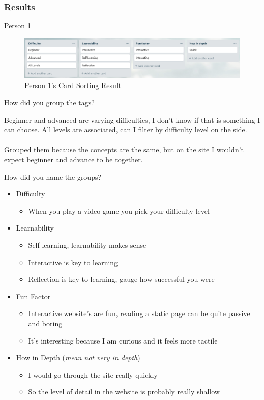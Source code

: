 \subsubsection{Results}
\begin{note}{Person 1}
	\begin{figure}[H]
		\centering
		\includegraphics[width=\linewidth]{card1}	
		\caption{Person 1's Card Sorting Result}
	\end{figure}

	How did you group the tags?
	\begin{leftbar}
		Beginner and advanced are varying difficulties, I don't know if that is something I can choose. All levels are associated, can I filter by difficulty level on the side.\\\\
		Grouped them because the concepts are the same, but on the site I wouldn't expect beginner and advance to be together.
	\end{leftbar}

	How did you name the groups?
	\begin{leftbar}
		\begin{itemize}
			\item Difficulty
			\begin{itemize}
				\item When you play a video game you pick your difficulty level
			\end{itemize}
			\item Learnability
			\begin{itemize}
				\item Self learning, learnability makes sense
				\item Interactive is key to learning
				\item Reflection is key to learning, gauge how successful you were
			\end{itemize}
			\item Fun Factor
			\begin{itemize}
				\item Interactive website's are fun, reading a static page can be quite passive and boring
				\item It's interesting because I am curious and it feels more tactile
			\end{itemize}
			\item How in Depth (\textit{mean not very in depth})	
			\begin{itemize}
				\item I would go through the site really quickly
				\item So the level of detail in the website is probably really shallow
			\end{itemize}
		\end{itemize}
	\end{leftbar}
\end{note}

